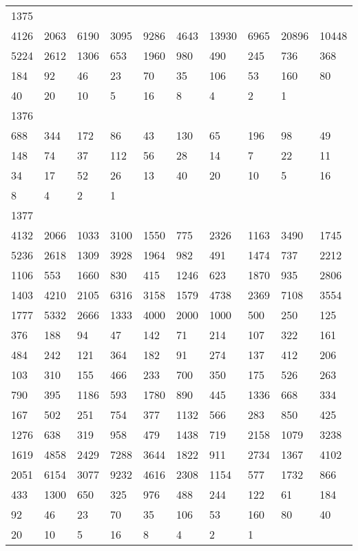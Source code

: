 \begin{longtable}{*{10}{l}}
1375&&&&&&&&&\\
4126& 2063& 6190& 3095& 9286& 4643& 13930& 6965& 20896& 10448\\
5224& 2612& 1306& 653& 1960& 980& 490& 245& 736& 368\\
184& 92& 46& 23& 70& 35& 106& 53& 160& 80\\
40& 20& 10& 5& 16& 8& 4& 2& 1& \\

1376&&&&&&&&&\\
688& 344& 172& 86& 43& 130& 65& 196& 98& 49\\
148& 74& 37& 112& 56& 28& 14& 7& 22& 11\\
34& 17& 52& 26& 13& 40& 20& 10& 5& 16\\
8& 4& 2& 1& \\

1377&&&&&&&&&\\
4132& 2066& 1033& 3100& 1550& 775& 2326& 1163& 3490& 1745\\
5236& 2618& 1309& 3928& 1964& 982& 491& 1474& 737& 2212\\
1106& 553& 1660& 830& 415& 1246& 623& 1870& 935& 2806\\
1403& 4210& 2105& 6316& 3158& 1579& 4738& 2369& 7108& 3554\\
1777& 5332& 2666& 1333& 4000& 2000& 1000& 500& 250& 125\\
376& 188& 94& 47& 142& 71& 214& 107& 322& 161\\
484& 242& 121& 364& 182& 91& 274& 137& 412& 206\\
103& 310& 155& 466& 233& 700& 350& 175& 526& 263\\
790& 395& 1186& 593& 1780& 890& 445& 1336& 668& 334\\
167& 502& 251& 754& 377& 1132& 566& 283& 850& 425\\
1276& 638& 319& 958& 479& 1438& 719& 2158& 1079& 3238\\
1619& 4858& 2429& 7288& 3644& 1822& 911& 2734& 1367& 4102\\
2051& 6154& 3077& 9232& 4616& 2308& 1154& 577& 1732& 866\\
433& 1300& 650& 325& 976& 488& 244& 122& 61& 184\\
92& 46& 23& 70& 35& 106& 53& 160& 80& 40\\
20& 10& 5& 16& 8& 4& 2& 1& \\


\end{longtable}
